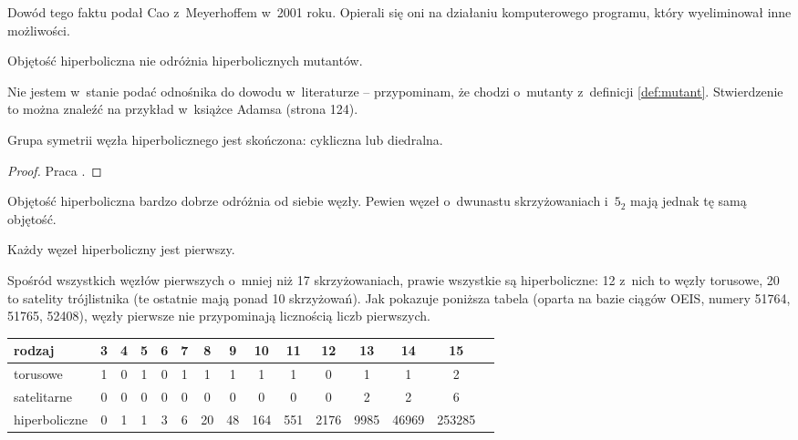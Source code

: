 Dowód tego faktu podał Cao z~Meyerhoffem w~2001 roku.
Opierali się oni na działaniu komputerowego programu, który wyeliminował inne możliwości.

\begin{proposition}
    Objętość hiperboliczna nie odróżnia hiperbolicznych mutantów.
\end{proposition}

Nie jestem w~stanie podać odnośnika do dowodu w~literaturze -- przypominam, że chodzi o~mutanty z~definicji \ref{def:mutant}.
Stwierdzenie to można znaleźć na przykład w~książce Adamsa (strona 124).

\begin{proposition}
    Grupa symetrii węzła hiperbolicznego jest skończona: cykliczna lub diedralna.
\end{proposition}

\begin{proof}
    Praca \cite{kodama92}.
\end{proof}

Objętość hiperboliczna bardzo dobrze odróżnia od siebie węzły.
Pewien węzeł o~dwunastu skrzyżowaniach i~$5_2$ mają jednak tę samą objętość.

\begin{proposition}
    Każdy węzeł hiperboliczny jest pierwszy.
\end{proposition}

Spośród wszystkich węzłów pierwszych o~mniej niż 17 skrzyżowaniach, prawie wszystkie są hiperboliczne: 12 z~nich to węzły torusowe, 20 to satelity trójlistnika (te ostatnie mają ponad 10 skrzyżowań).
Jak pokazuje poniższa tabela (oparta na bazie ciągów OEIS, numery 51764, 51765, 52408), węzły pierwsze nie przypominają licznością liczb pierwszych.

\renewcommand*{\arraystretch}{1.4}
\footnotesize
\begin{longtable}{lcccccccccccccc}
\hline
    \textbf{rodzaj} & 3 & 4 & 5 & 6 & 7 & 8  & 9  & 10  & 11  & 12   & 13   & 14    & 15     \\ \hline \endhead
    torusowe        & 1 & 0 & 1 & 0 & 1 & 1  & 1  & 1   & 1   & 0    & 1    & 1     & 2      \\
    satelitarne     & 0 & 0 & 0 & 0 & 0 & 0  & 0  & 0   & 0   & 0    & 2    & 2     & 6      \\
    hiperboliczne   & 0 & 1 & 1 & 3 & 6 & 20 & 48 & 164 & 551 & 2176 & 9985 & 46969 & 253285 \\
    \hline
\end{longtable}
\normalsize

